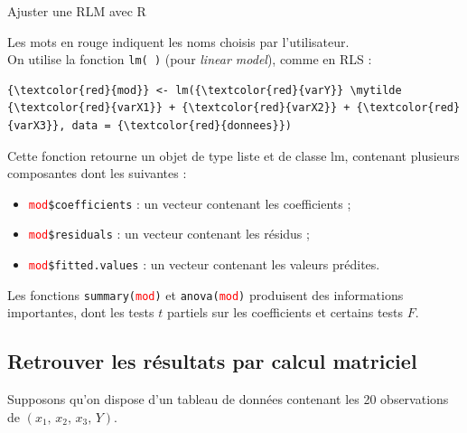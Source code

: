 \documentclass[letter, 11pt]{article}
\newcommand{\mytilde}{$\sim$}
\begin{document}
\vspace*{0.01 cm}
\begin{center}
{\Large Ajuster une RLM avec R }
\end{center}

Les mots en rouge indiquent les noms choisis par l'utilisateur.\\


On utilise la fonction {\tt lm( )} (pour {\it linear model}), comme en RLS :

\begin{Verbatim}[commandchars=\\\{\}]
{\textcolor{red}{mod}} <- lm({\textcolor{red}{varY}} \mytilde {\textcolor{red}{varX1}} + {\textcolor{red}{varX2}} + {\textcolor{red}{varX3}}, data = {\textcolor{red}{donnees}})
\end{Verbatim}


Cette fonction retourne un objet de type liste et de classe lm, contenant plusieurs composantes dont les suivantes :
\begin{itemize}\itemsep-1mm
\item \texttt{{\textcolor{red}{mod}}\$coefficients} : un vecteur contenant les coefficients ;
\item \texttt{{\textcolor{red}{mod}}\$residuals} : un vecteur contenant les résidus ;
\item \texttt{{\textcolor{red}{mod}}\$fitted.values} : un vecteur contenant les valeurs prédites.
\end{itemize}

Les fonctions {\tt summary({\textcolor{red}{mod}})} et {\tt anova({\textcolor{red}{mod}})} produisent des informations importantes, dont les tests $t$ partiels sur les coefficients et certains tests $F$.

\vspace{0.1 in}
\subsection*{Retrouver les résultats par calcul matriciel}

Supposons qu'on dispose d'un tableau de données contenant les 20 observations de $(x_1,\,x_2,\,x_3,\,Y)$.
\end{document}
